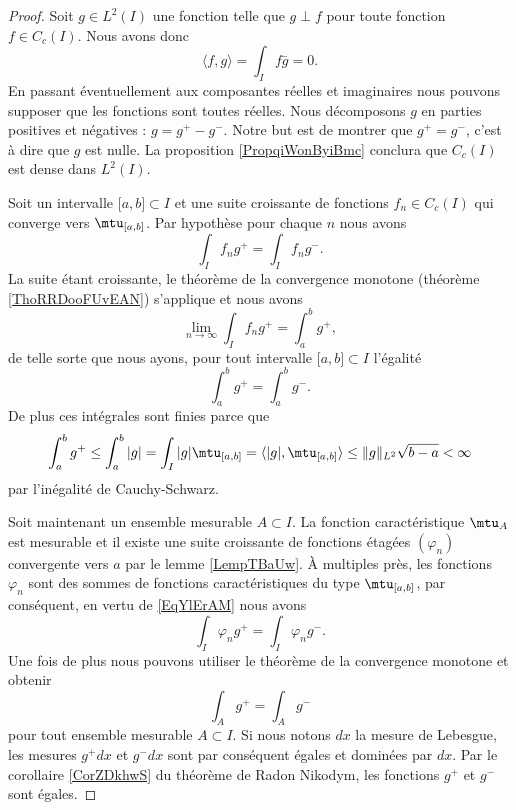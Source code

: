 \begin{proof}
    Soit \( g\in L^2(I)\) une fonction telle que \( g\perp f\) pour toute fonction \( f\in C_c(I)\). Nous avons donc
    \begin{equation}
        \langle f, g\rangle =\int_If\bar g=0.
    \end{equation}
    En passant éventuellement aux composantes réelles et imaginaires nous pouvons supposer que les fonctions sont toutes réelles. Nous décomposons \( g\) en parties positives et négatives : \( g=g^+-g^-\). Notre but est de montrer que \( g^+=g^-\), c'est à dire que \( g\) est nulle. La proposition \ref{PropqiWonByiBmc} conclura que \( C_c(I)\) est dense dans \( L^2(I)\).

    Soit un intervalle \( \mathopen[ a , b \mathclose]\subset I\) et une suite croissante de fonctions \( f_n\in C_c(I)\) qui converge vers \( \mtu_{\mathopen[ a , b \mathclose]}\). Par hypothèse pour chaque \( n\) nous avons
    \begin{equation}
        \int_If_ng^+=\int_I f_ng^-.
    \end{equation}
    La suite étant croissante, le théorème de la convergence monotone (théorème \ref{ThoRRDooFUvEAN}) s'applique et nous avons
    \begin{equation}
        \lim_{n\to \infty} \int_I f_ng^+=\int_a^bg^+,
    \end{equation}
    de telle sorte que nous ayons, pour tout intervalle \( \mathopen[ a , b \mathclose]\subset I\) l'égalité
    \begin{equation}        \label{EqYlErAM}
        \int_a^bg^+=\int_a^bg^-.
    \end{equation}
    De plus ces intégrales sont finies parce que
    \begin{equation}
        \int_a^b g^+\leq\int_a^b| g |=\int_I| g |\mtu_{\mathopen[ a , b \mathclose]}=\langle | g |, \mtu_{\mathopen[ a , b \mathclose]}\rangle \leq \| g \|_{L^2}\sqrt{b-a}<\infty
    \end{equation}
    par l'inégalité de Cauchy-Schwarz.

    Soit maintenant un ensemble mesurable \( A\subset I\). La fonction caractéristique \( \mtu_A\) est mesurable et il existe une suite croissante de fonctions étagées \( (\varphi_n)\) convergente vers \( a\) par le lemme \ref{LempTBaUw}. À multiples près, les fonctions \( \varphi_n\) sont des sommes de fonctions caractéristiques du type \( \mtu_{\mathopen[ a , b \mathclose]}\), par conséquent, en vertu de \eqref{EqYlErAM} nous avons
    \begin{equation}
        \int_I\varphi_ng^+=\int_I\varphi_ng^-.
    \end{equation}
    Une fois de plus nous pouvons utiliser le théorème de la convergence monotone et obtenir
    \begin{equation}
        \int_Ag^+=\int_A g^-
    \end{equation}
    pour tout ensemble mesurable \( A\subset I\). Si nous notons \( dx\) la mesure de Lebesgue, les mesures \( g^+dx\) et \( g^-dx\) sont par conséquent égales et dominées par \( dx\). Par le corollaire \ref{CorZDkhwS} du théorème de Radon Nikodym, les fonctions \( g^+\) et \( g^-\) sont égales.
\end{proof}

